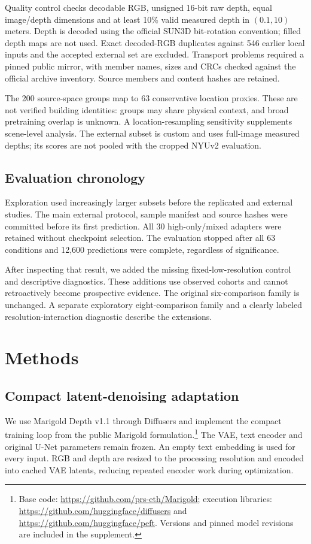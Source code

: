Quality control checks decodable RGB, unsigned 16-bit raw depth, equal image/depth dimensions and at least 10\% valid measured depth in $(0.1,10)$ meters. Depth is decoded using the official SUN3D bit-rotation convention; filled depth maps are not used. Exact decoded-RGB duplicates against 546 earlier local inputs and the accepted external set are excluded. Transport problems required a pinned public mirror, with member names, sizes and CRCs checked against the official archive inventory. Source members and content hashes are retained.

The 200 source-space groups map to 63 conservative location proxies. These are not verified building identities: groups may share physical context, and broad pretraining overlap is unknown. A location-resampling sensitivity supplements scene-level analysis. The external subset is custom and uses full-image measured depths; its scores are not pooled with the cropped NYUv2 evaluation.

\subsection{Evaluation chronology}
Exploration used increasingly larger subsets before the replicated and external studies. The main external protocol, sample manifest and source hashes were committed before its first prediction. All 30 high-only/mixed adapters were retained without checkpoint selection. The evaluation stopped after all 63 conditions and 12,600 predictions were complete, regardless of significance.

After inspecting that result, we added the missing fixed-low-resolution control and descriptive diagnostics. These additions use observed cohorts and cannot retroactively become prospective evidence. The original six-comparison family is unchanged. A separate exploratory eight-comparison family and a clearly labeled resolution-interaction diagnostic describe the extensions.

\section{Methods}
\subsection{Compact latent-denoising adaptation}
We use Marigold Depth v1.1 through Diffusers and implement the compact training loop from the public Marigold formulation.\footnote{Base code: \url{https://github.com/prs-eth/Marigold}; execution libraries: \url{https://github.com/huggingface/diffusers} and \url{https://github.com/huggingface/peft}. Versions and pinned model revisions are included in the supplement.} The VAE, text encoder and original U-Net parameters remain frozen. An empty text embedding is used for every input. RGB and depth are resized to the processing resolution and encoded into cached VAE latents, reducing repeated encoder work during optimization.

